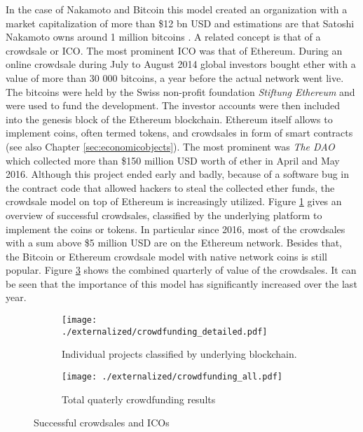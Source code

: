 In the case of Nakamoto and Bitcoin this model created an organization with a market capitalization of more than \$12 bn USD and estimations are that Satoshi Nakamoto owns around 1 million bitcoins \parencite{Lerner2016}. A related concept is that of a crowdsale or \ac{ICO}. The most prominent \ac{ICO} was that of Ethereum. During an online crowdsale during July to August 2014 global investors bought ether with a value of more than 30 000 bitcoins, a year before the actual network went live. The bitcoins were held by the Swiss non-profit foundation \emph{Stiftung Ethereum} and were used to fund the development. The investor accounts were then included into the genesis block of the Ethereum blockchain. Ethereum itself allows to implement coins, often termed tokens, and crowdsales in form of smart contracts (see also Chapter \ref{sec:economicobjects}). The most prominent was \emph{The DAO} which collected more than \$150 million USD worth of ether in April and May 2016. Although this project ended early and badly, because of a software bug in the contract code that allowed hackers to steal the collected ether funds, the crowdsale model on top of Ethereum is increasingly utilized. Figure \ref{fig:eco:crowdfunding_detailed} gives an overview of successful crowdsales, classified by the underlying platform to implement the coins or tokens. In particular since 2016, most of the crowdsales with a sum above \$5 million USD are on the Ethereum network. Besides that, the Bitcoin or Ethereum crowdsale model with native network coins is still popular. Figure \ref{fig:eco:crowdfunding_all} shows the combined quarterly of value of the crowdsales. It can be seen that the importance of this model has significantly increased over the last year. 

\begin{figure}[ht]
  \centering
  \begin{subfigure}[t]{0.45\linewidth}
    \centering\texttt{[image: ./externalized/crowdfunding\_detailed.pdf]}
    \caption{Individual projects classified by underlying blockchain.}
    \label{fig:eco:crowdfunding_detailed}
  \end{subfigure}%
  \begin{subfigure}[t]{0.45\linewidth}
    \centering\texttt{[image: ./externalized/crowdfunding\_all.pdf]}
    \caption{Total quaterly crowdfunding results}
    \label{fig:eco:crowdfunding_all}
  \end{subfigure}
  \caption{Successful crowdsales and \ac{ICO}s}
\end{figure}

